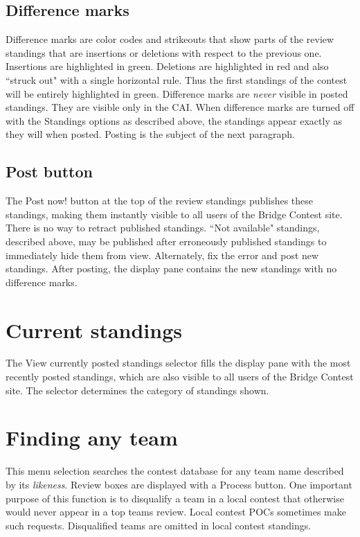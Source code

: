 \documentclass[11pt,letterpaper]{refart}
\def\ui#1{\textsf{#1}}
\begin{document}
\subsection{Difference marks}
Difference marks are color codes and strikeouts that show parts of the review standings
that are insertions or deletions with respect to the previous one. Insertions are highlighted in green.
Deletions are highlighted in red and also ``struck out" with a single horizontal rule. Thus 
the first standings of the contest will be entirely highlighted in green. Difference marks are
\emph{never} visible in posted standings. They are visible only in the CAI. When difference
marks are turned off with the \ui{Standings options} as described above, the standings appear
exactly as they will when posted. Posting is the subject of the next paragraph.

\subsection{Post button}
The \ui{Post now!} button at the top of the review standings publishes these standings, making them
instantly visible to all users of the Bridge Contest site. There is no way to retract published standings.
``Not available" standings, described above, may be published after erroneously published standings
to immediately hide them from view. Alternately, fix the error and post new standings.
After posting, the display pane contains the new standings with no difference marks.

\section{Current standings}
The \ui{View currently posted standings} selector fills the display pane with the
most recently posted standings, which are also visible to all users of the Bridge Contest site. The
selector determines the category of standings shown.

\section{Finding any team}
This menu selection searches the contest database for any team name described 
by its \emph{likeness}. Review boxes are displayed with a \ui{Process} button. One
important purpose of this function is to disqualify a team in a local contest that otherwise 
would never appear in a top teams review. Local contest POCs sometimes make 
such requests. Disqualified teams are omitted in local contest standings. 
\end{document}

